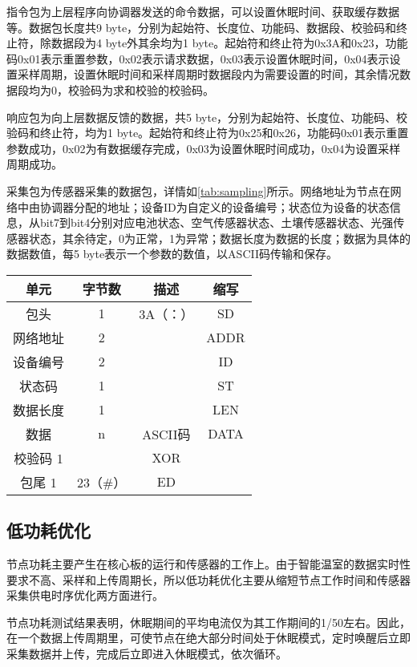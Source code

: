 指令包为上层程序向协调器发送的命令数据，可以设置休眠时间、获取缓存数据等。数据包长度共9 byte，分别为起始符、长度位、功能码、数据段、校验码和终止符，除数据段为4 byte外其余均为1 byte。起始符和终止符为0x3A和0x23，功能码0x01表示重置参数，0x02表示请求数据，0x03表示设置休眠时间，0x04表示设置采样周期，设置休眠时间和采样周期时数据段内为需要设置的时间，其余情况数据段均为0，校验码为求和校验的校验码。

响应包为向上层数据反馈的数据，共5 byte，分别为起始符、长度位、功能码、校验码和终止符，均为1 byte。起始符和终止符为0x25和0x26，功能码0x01表示重置参数成功，0x02为有数据缓存完成，0x03为设置休眠时间成功，0x04为设置采样周期成功。

采集包为传感器采集的数据包，详情如\ref{tab:sampling}所示。网络地址为节点在网络中由协调器分配的地址；设备ID为自定义的设备编号；状态位为设备的状态信息，从bit7到bit4分别对应电池状态、空气传感器状态、土壤传感器状态、光强传感器状态，其余待定，0为正常，1为异常；数据长度为数据的长度；数据为具体的数据数值，每5 byte表示一个参数的数值，以ASCII码传输和保存。
		\begin{table}[!hpb]
  			\centering
  			\begin{tabular}{cccc} \toprule
			单元 & 	字节数 & 	描述 & 	缩写\\ \midrule
			包头 & 	1 & 	3A（：）	 & SD\\
			网络地址 & 	2 & 	 & 	ADDR\\
			设备编号 & 	2 & 	 & 	ID\\
			状态码	 & 1	 & &  	ST\\
			数据长度	 & 1	 &  & 	LEN\\
			数据 & 	n & 	ASCII码 & 	DATA\\
			校验码	1	 &  & 	XOR\\
			包尾	1	 & 23（#） & 	ED\\ \bottomrule
 			\end{tabular}
		\end{table}
		
	\subsection{低功耗优化}
	节点功耗主要产生在核心板的运行和传感器的工作上。由于智能温室的数据实时性要求不高、采样和上传周期长，所以低功耗优化主要从缩短节点工作时间和传感器采集供电时序优化两方面进行。
	
节点功耗测试结果表明，休眠期间的平均电流仅为其工作期间的1/50左右。因此，在一个数据上传周期里，可使节点在绝大部分时间处于休眠模式，定时唤醒后立即采集数据并上传，完成后立即进入休眠模式，依次循环。

